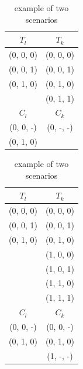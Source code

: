 \documentclass{sig-alternate}
\begin{document}
\begin{table}
\centering
\caption{example of two scenarios}
\label{example_three_condition}
  \begin{tabular}{cc}
$T_{l}$&$T_{k}$ \\ \hline
(0, 0, 0)&(0, 0, 0)\\
(0, 0, 1)&(0, 0, 1) \\
(0, 1, 0)&(0, 1, 0)\\
         &(0, 1, 1) \\ \hline
 $C_{l}$&$C_{k}$ \\ \hline
(0, 0, -)&(0, -, -)\\
(0, 1, 0)&		   \\ \hline
  \end{tabular}
  \hspace{1em}
  \begin{tabular}{cc}
$T_{l}$&$T_{k}$\\ \hline
(0, 0, 0) & (0, 0, 0)\\
(0, 0, 1) & (0, 0, 1)\\
(0, 1, 0) & (0, 1, 0)\\
		  & (1, 0, 0)\\
		  & (1, 0, 1)\\
		  & (1, 1, 0)\\
		  & (1, 1, 1)\\ \hline
$C_{l}$&$C_{k}$ \\ \hline
(0, 0, -)&  (0, 0, -)\\
(0, 1, 0)&  (0, 1, 0)\\
		 &  (1, -, -)\\  \hline
  \end{tabular}
  \end{table}


\end{document}
